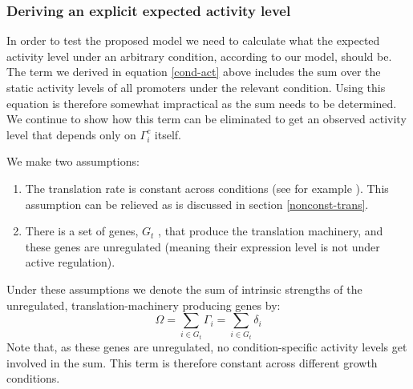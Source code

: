 \documentclass[a4page,notitlepage]{article}
\begin{document}
\subsubsection{Deriving an explicit expected activity level}
In order to test the proposed model we need to calculate what the expected activity level under an arbitrary condition, according to our model, should be.
The term we derived in equation \ref{cond-act} above includes the sum over the static activity levels of all promoters under the relevant condition.
Using this equation is therefore somewhat impractical as the sum needs to be determined.
We continue to show how this term can be eliminated to get an observed activity level that depends only on $\Gamma^c_i$ itself.

We make two assumptions:
\begin{enumerate}
\item The translation rate is constant across conditions (see for example \parencite{Neidhardt1999a}).
This assumption can be relieved as is discussed in section \ref{nonconst-trans}.
\item There is a set of genes, $G_t$ , that produce the translation machinery, and these genes are unregulated (meaning their expression level is not under active regulation).
\end{enumerate}
Under these assumptions we denote the sum of intrinsic strengths of the unregulated, translation-machinery producing genes by:
\[\Omega=\sum_{i \in G_t}\Gamma_i=\sum_{i \in G_t}\delta_i\]
Note that, as these genes are unregulated, no condition-specific activity levels get involved in the sum.
This term is therefore constant across different growth conditions.
\end{document}
